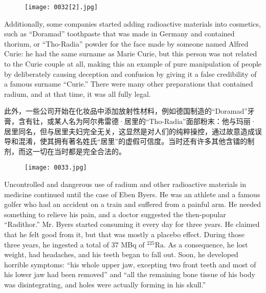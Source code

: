 \documentclass[dvipsnames, svgnames,a4paper,11pt]{article}
\begin{document}
\begin{figure}[htbp]
      \centering
      \texttt{[image: 0032[2].jpg]}
       \label{fig20}
\end{figure}

Additionally, some companies started adding radioactive materials into cosmetics, such as “Doramad” toothpaste that was made in Germany and contained thorium, or “Tho-Radia” powder for the face made by someone named Alfred Curie: he had the same surname as Marie Curie, but this person was not related to the Curie couple at all, making this an example of pure manipulation of people by deliberately causing deception and confusion by giving it a false credibility of a famous surname “Curie.” There were many other preparations that contained radium, and at that time, it was all fully legal.

此外，一些公司开始在化妆品中添加放射性材料，例如德国制造的“Doramad”牙膏，含有钍，或某人名为阿尔弗雷德·居里的“Tho-Radia”面部粉末：他与玛丽·居里同名，但与居里夫妇完全无关，这显然是对人们的纯粹操控，通过故意造成误导和混淆，使其拥有著名姓氏“居里”的虚假可信度。当时还有许多其他含镭的制剂，而这一切在当时都是完全合法的。

\begin{figure}[htbp]
      \centering
      \texttt{[image: 0033.jpg]}
       \label{fig21}
\end{figure}

Uncontrolled and dangerous use of radium and other radioactive materials in medicine continued until the case of Eben Byers. He was an athlete and a famous golfer who had an accident on a train and suffered from a painful arm. He needed something to relieve his pain, and a doctor suggested the then-popular “Radithor.” Mr. Byers started consuming it every day for three years. He claimed that he felt good from it, but that was mostly a placebo effect. During those three years, he ingested a total of 37 MBq of \(\mathrm{^{225}Ra}\). As a consequence, he lost weight, had headaches, and his teeth began to fall out. Soon, he developed horrible symptoms: “his whole upper jaw, excepting two front teeth and most of his lower jaw had been removed” and “all the remaining bone tissue of his body was disintegrating, and holes were actually forming in his skull.”
\end{document}
